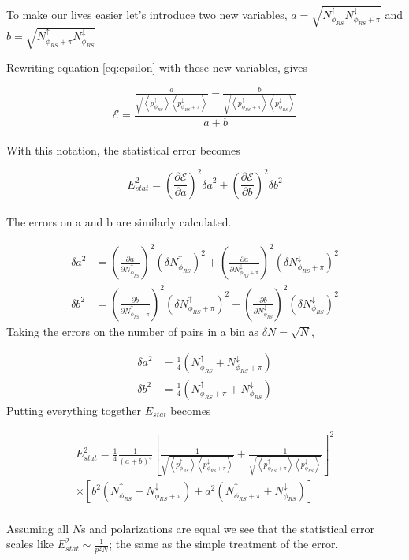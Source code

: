 \documentclass[abstract = on,listof=totoc, bibliography=totoc]{scrreprt}
\newcommand{\phirs}{\phi_{RS}}
\begin{document}
To make our lives easier let's introduce two new variables, $a = \sqrt{N^\uparrow_{\phi_{RS}}N^\downarrow_{\phi_{RS}+\pi}}$ and $b = \sqrt{N^\uparrow_{\phi_{RS}+\pi}N^\downarrow_{\phi_{RS}}}$

Rewriting equation \ref{eq:epsilon} with these new variables, gives

\begin{equation}
\label{eq:epsilonAB}
\mathcal{E} = \frac{\frac{a}{\sqrt{\left<p^\uparrow_{\phirs}\right>\left<p^\downarrow_{\phirs+\pi}\right>}}  - \frac{b}{\sqrt{\left<p^\uparrow_{\phirs+\pi}\right>\left<p^\downarrow_{\phirs}\right>}}} {a+b}
\end{equation}\\
%
With this notation, the statistical error becomes

\begin{equation}
\label{eq:Estat}
E_{stat}^2 = \left(\frac{\partial \mathcal{E}}{\partial a}\right)^2 {\delta a}^2 + \left(\frac{\partial \mathcal{E}}{\partial b}\right)^2 {\delta b}^2
\end{equation}\\
%
The errors on a and b are similarly calculated. 


\begin{align}
{\delta a}^2 &= \left(\frac{\partial a}{\partial N^\uparrow_{\phirs}}\right)^2 \left(\delta N^\uparrow_{\phirs}\right)^2 + \left(\frac{\partial a}{\partial N^\downarrow_{\phirs+\pi}}\right)^2 \left(\delta N^\downarrow_{\phirs+\pi}\right)^2 \\
{\delta b}^2 &= \left(\frac{\partial b}{\partial N^\uparrow_{\phirs+\pi}}\right)^2 \left(\delta N^\uparrow_{\phirs+\pi}\right)^2 + \left(\frac{\partial b}{\partial N^\downarrow_{\phirs}}\right)^2 \left(\delta N^\downarrow_{\phirs}\right)^2 
\end{align}
%
Taking the errors on the number of pairs in a bin as $\delta N = \sqrt{N}$,

\begin{align}
{\delta a}^2 &= \frac{1}{4}\left(N^\uparrow_{\phirs}+ N^\downarrow_{\phirs+\pi}\right)\\
{\delta b}^2 &=  \frac{1}{4}\left(N^\uparrow_{\phirs+\pi}+ N^\downarrow_{\phirs}\right)
\end{align}
%
Putting everything together $E_{stat}$ becomes

\begin{align}
E_{stat}^2 = \frac{1}{4}\frac{1}{\left(a+b\right)^4} \left[\frac{1}{\sqrt{\left<p^\uparrow_{\phirs}\right>\left<p^\downarrow_{\phirs+\pi}\right>}}+\frac{1}{\sqrt{\left<p^\uparrow_{\phirs+\pi}\right>\left<p^\downarrow_{\phirs}\right>}}\right]^2 \\ \nonumber
\times \left[b^2\left(N^\uparrow_{\phirs} + N^\downarrow_{\phirs+\pi}\right) + a^2 \left(N^\uparrow_{\phirs+\pi} +  N^\downarrow_{\phirs} \right)\right]
\end{align}\\
%
Assuming all $N$s and polarizations are equal we see that the statistical error scales like $E_{stat}^2 \sim \frac{1}{p^2 N}$; the same as the simple treatment of the error.
\end{document}
